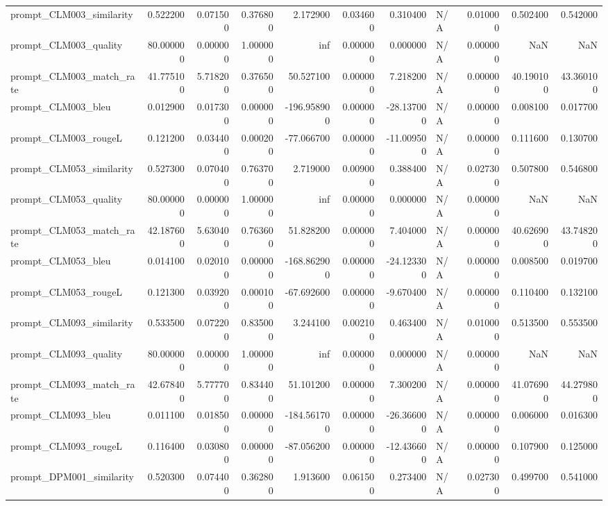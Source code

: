 \begin{tabular}{lrrrrrrlrrr}
prompt_CLM003_similarity & 0.522200 & 0.071500 & 0.376800 & 2.172900 & 0.034600 & 0.310400 & N/A & 0.010000 & 0.502400 & 0.542000 \\
prompt_CLM003_quality & 80.000000 & 0.000000 & 1.000000 & inf & 0.000000 & 0.000000 & N/A & 0.000000 & NaN & NaN \\
prompt_CLM003_match_rate & 41.775100 & 5.718200 & 0.376500 & 50.527100 & 0.000000 & 7.218200 & N/A & 0.000000 & 40.190100 & 43.360100 \\
prompt_CLM003_bleu & 0.012900 & 0.017300 & 0.000000 & -196.958900 & 0.000000 & -28.137000 & N/A & 0.000000 & 0.008100 & 0.017700 \\
prompt_CLM003_rougeL & 0.121200 & 0.034400 & 0.000200 & -77.066700 & 0.000000 & -11.009500 & N/A & 0.000000 & 0.111600 & 0.130700 \\
prompt_CLM053_similarity & 0.527300 & 0.070400 & 0.763700 & 2.719000 & 0.009000 & 0.388400 & N/A & 0.027300 & 0.507800 & 0.546800 \\
prompt_CLM053_quality & 80.000000 & 0.000000 & 1.000000 & inf & 0.000000 & 0.000000 & N/A & 0.000000 & NaN & NaN \\
prompt_CLM053_match_rate & 42.187600 & 5.630400 & 0.763600 & 51.828200 & 0.000000 & 7.404000 & N/A & 0.000000 & 40.626900 & 43.748200 \\
prompt_CLM053_bleu & 0.014100 & 0.020100 & 0.000000 & -168.862900 & 0.000000 & -24.123300 & N/A & 0.000000 & 0.008500 & 0.019700 \\
prompt_CLM053_rougeL & 0.121300 & 0.039200 & 0.000100 & -67.692600 & 0.000000 & -9.670400 & N/A & 0.000000 & 0.110400 & 0.132100 \\
prompt_CLM093_similarity & 0.533500 & 0.072200 & 0.835000 & 3.244100 & 0.002100 & 0.463400 & N/A & 0.010000 & 0.513500 & 0.553500 \\
prompt_CLM093_quality & 80.000000 & 0.000000 & 1.000000 & inf & 0.000000 & 0.000000 & N/A & 0.000000 & NaN & NaN \\
prompt_CLM093_match_rate & 42.678400 & 5.777700 & 0.834400 & 51.101200 & 0.000000 & 7.300200 & N/A & 0.000000 & 41.076900 & 44.279800 \\
prompt_CLM093_bleu & 0.011100 & 0.018500 & 0.000000 & -184.561700 & 0.000000 & -26.366000 & N/A & 0.000000 & 0.006000 & 0.016300 \\
prompt_CLM093_rougeL & 0.116400 & 0.030800 & 0.000000 & -87.056200 & 0.000000 & -12.436600 & N/A & 0.000000 & 0.107900 & 0.125000 \\
prompt_DPM001_similarity & 0.520300 & 0.074400 & 0.362800 & 1.913600 & 0.061500 & 0.273400 & N/A & 0.027300 & 0.499700 & 0.541000 \\

\end{tabular}
